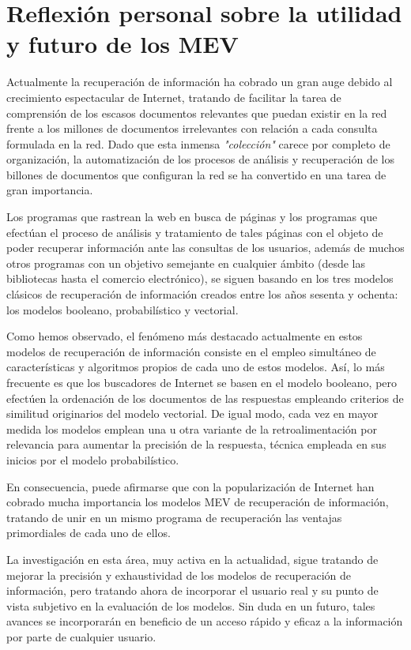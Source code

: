 \documentclass[titlepage]{article}
\begin{document}
	\section{Reflexión personal sobre la utilidad y futuro de los MEV}
	
	Actualmente la recuperación de información ha cobrado un gran auge debido al crecimiento espectacular de Internet, tratando de facilitar la tarea de comprensión de los escasos documentos relevantes que puedan existir en la red frente a los millones de documentos irrelevantes con relación a cada consulta formulada en la red. Dado que esta inmensa \textit{"colección"} carece por completo de organización, la automatización de los procesos de análisis y recuperación de los billones de documentos que configuran la red se ha convertido en una tarea de gran importancia.
	
	Los programas que rastrean la web en busca de páginas y los programas que efectúan el proceso de análisis y tratamiento de tales páginas con el objeto de poder recuperar información ante las consultas de los usuarios, además de muchos otros programas con un objetivo semejante en cualquier ámbito (desde las bibliotecas hasta el comercio electrónico), se siguen basando en los tres modelos clásicos de recuperación de información creados entre los años sesenta y ochenta: los modelos booleano, probabilístico y vectorial. 
	
	Como hemos observado, el fenómeno más destacado actualmente en estos modelos de recuperación de información consiste en el empleo simultáneo de características y algoritmos propios de cada uno de estos modelos. Así, lo más frecuente es que los buscadores de Internet se basen en el modelo booleano, pero efectúen la ordenación de los documentos de las respuestas empleando criterios de similitud originarios del modelo vectorial. De igual modo, cada vez en mayor medida los modelos emplean una u otra variante de la retroalimentación por relevancia para aumentar la precisión de la respuesta, técnica empleada en sus inicios por el modelo probabilístico.
	
	En consecuencia, puede afirmarse que con la popularización de Internet han cobrado mucha importancia los modelos MEV de recuperación de información, tratando de unir en un mismo programa de recuperación las ventajas primordiales de cada uno de ellos. 
	
	La investigación en esta área, muy activa en la actualidad, sigue tratando de mejorar la precisión y exhaustividad de los modelos de recuperación de información, pero tratando ahora de incorporar el usuario real y su punto de vista subjetivo en la evaluación de los modelos. Sin duda en un futuro, tales avances se incorporarán en beneficio de un acceso rápido y eficaz a la información por parte de cualquier usuario.
	
\end{document}
